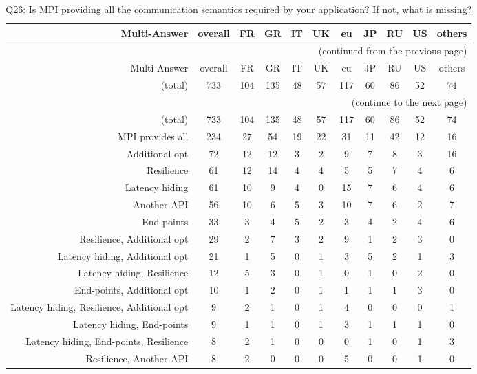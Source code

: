 \clearpage%
{\footnotesize\begin{landscape}%
\begin{longtable}[htb]{r|c|c|c|c|c|c|c|c|c|c}%
\caption{Q26: Is MPI providing all the communication semantics required by your application? If not, what is missing?}%
\label{tab:Q26-mans} \\%
\hline%
Multi-Answer & overall & FR & GR & IT & UK & eu & JP & RU & US & others \\
 \hline%
\endfirsthead%
\multicolumn{11}{r}{(continued from the previous page)}\\%
\hline%
Multi-Answer & overall & FR & GR & IT & UK & eu & JP & RU & US & others \\
 \hline%
\endhead%
\hline%
(total) & 733 & 104 & 135 & 48 & 57 & 117 & 60 & 86 & 52 & 74 \\%
\hline%
\multicolumn{11}{r}{(continue to the next page)}\\%
\endfoot%
\hline%
(total) & 733 & 104 & 135 & 48 & 57 & 117 & 60 & 86 & 52 & 74 \\%
\hline%
\endlastfoot%
\hline%
{MPI provides all} & 234 & 27 & 54 & 19 & 22 & 31 & 11 & 42 & 12 & 16 \\%
{Additional opt} & 72 & 12 & 12 & 3 & 2 & 9 & 7 & 8 & 3 & 16 \\%
{Resilience} & 61 & 12 & 14 & 4 & 4 & 5 & 5 & 7 & 4 & 6 \\%
{Latency hiding} & 61 & 10 & 9 & 4 & 0 & 15 & 7 & 6 & 4 & 6 \\%
{Another API} & 56 & 10 & 6 & 5 & 3 & 10 & 7 & 6 & 2 & 7 \\%
{End-points} & 33 & 3 & 4 & 5 & 2 & 3 & 4 & 2 & 4 & 6 \\%
{Resilience, Additional opt} & 29 & 2 & 7 & 3 & 2 & 9 & 1 & 2 & 3 & 0 \\%
{Latency hiding, Additional opt} & 21 & 1 & 5 & 0 & 1 & 3 & 5 & 2 & 1 & 3 \\%
{Latency hiding, Resilience} & 12 & 5 & 3 & 0 & 1 & 0 & 1 & 0 & 2 & 0 \\%
{End-points, Additional opt} & 10 & 1 & 2 & 0 & 1 & 1 & 1 & 1 & 3 & 0 \\%
{Latency hiding, Resilience, Additional opt} & 9 & 2 & 1 & 0 & 1 & 4 & 0 & 0 & 0 & 1 \\%
{Latency hiding, End-points} & 9 & 1 & 1 & 0 & 1 & 3 & 1 & 1 & 1 & 0 \\%
{Latency hiding, End-points, Resilience} & 8 & 2 & 1 & 0 & 0 & 0 & 1 & 0 & 1 & 3 \\%
{Resilience, Another API} & 8 & 2 & 0 & 0 & 0 & 5 & 0 & 0 & 1 & 0 \\%

\end{longtable}
\end{landscape}}
